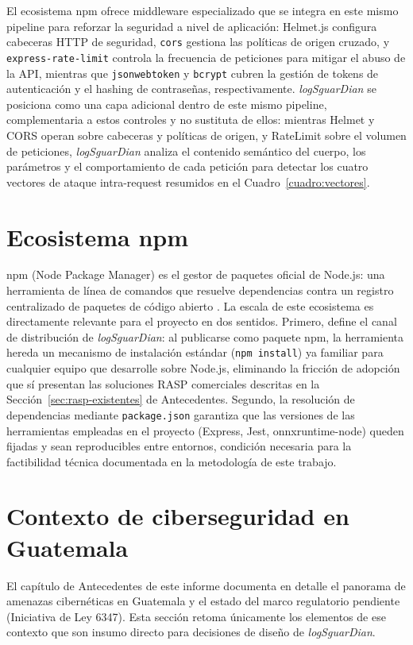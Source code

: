 El ecosistema npm ofrece middleware especializado que se integra en este mismo pipeline para
reforzar la seguridad a nivel de aplicación: Helmet.js configura cabeceras HTTP de seguridad,
\texttt{cors} gestiona las políticas de origen cruzado, y \texttt{express-rate-limit} \cite{expressratelimit2026} controla la frecuencia de peticiones para
mitigar el abuso de la API, mientras que \texttt{jsonwebtoken} \cite{auth02026jsonwebtoken} y
\texttt{bcrypt} \cite{kelektiv2026bcrypt} cubren la gestión de tokens de autenticación y el hashing
de contraseñas, respectivamente. \textit{logSguarDian} se posiciona como una capa adicional
dentro de este mismo pipeline, complementaria a estos controles y no sustituta de ellos: mientras
Helmet y CORS operan sobre cabeceras y políticas de origen, y RateLimit sobre el volumen de
peticiones, \textit{logSguarDian} analiza el contenido semántico del cuerpo, los parámetros y el
comportamiento de cada petición para detectar los cuatro vectores de ataque intra-request
resumidos en el Cuadro~\ref{cuadro:vectores}.

\section{Ecosistema npm}
npm (Node Package Manager) es el gestor de paquetes oficial de Node.js: una herramienta de línea
de comandos que resuelve dependencias contra un registro centralizado de paquetes de código
abierto \cite{npmregistry2024}. La escala de este ecosistema es directamente relevante para el
proyecto en dos sentidos. Primero, define el canal de distribución de \textit{logSguarDian}: al
publicarse como paquete npm, la herramienta hereda un mecanismo de instalación estándar
(\texttt{npm install}) ya familiar para cualquier equipo que desarrolle sobre Node.js, eliminando la
fricción de adopción que sí presentan las soluciones RASP comerciales descritas en la
Sección~\ref{sec:rasp-existentes} de Antecedentes. Segundo, la resolución de dependencias mediante \texttt{package.json}
garantiza que las versiones de las herramientas empleadas en el proyecto (Express, Jest,
onnxruntime-node) queden fijadas y sean reproducibles entre entornos, condición necesaria para la
factibilidad técnica documentada en la metodología de este trabajo.

\section{Contexto de ciberseguridad en Guatemala}
\label{sec:contexto-guatemala}
El capítulo de Antecedentes de este informe documenta en detalle el panorama de amenazas
cibernéticas en Guatemala y el estado del marco regulatorio pendiente (Iniciativa de Ley 6347).
Esta sección retoma únicamente los elementos de ese contexto que son insumo directo para
decisiones de diseño de \textit{logSguarDian}.

